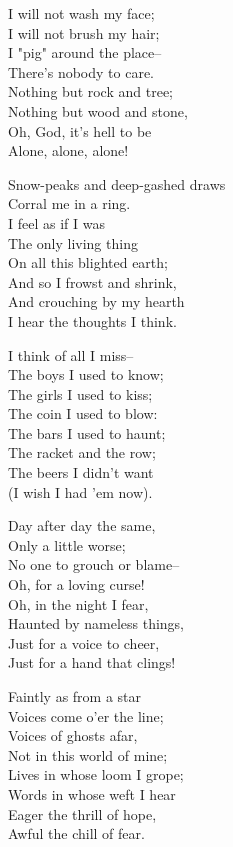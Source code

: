
\begin{poemblock}
I will not wash my face;\\
\idt I will not brush my hair;\\
I "pig" around the place--\\
\idt There's nobody to care.\\
Nothing but rock and tree;\\
\idt Nothing but wood and stone,\\
Oh, God, it's hell to be\\
\idt Alone, alone, alone!

Snow-peaks and deep-gashed draws\\
\idt Corral me in a ring.\\
I feel as if I was\\
\idt The only living thing\\
On all this blighted earth;\\
\idt And so I frowst and shrink,\\
And crouching by my hearth\\
\idt I hear the thoughts I think.

I think of all I miss--\\
\idt The boys I used to know;\\
The girls I used to kiss;\\
\idt The coin I used to blow:\\
The bars I used to haunt;\\
\idt The racket and the row;\\
The beers I didn't want\\
\idt (I wish I had 'em now).

Day after day the same,\\
\idt Only a little worse;\\
No one to grouch or blame--\\
\idt Oh, for a loving curse!\\
Oh, in the night I fear,\\
\idt Haunted by nameless things,\\
Just for a voice to cheer,\\
\idt Just for a hand that clings!

Faintly as from a star\\
\idt Voices come o'er the line;\\
Voices of ghosts afar,\\
\idt Not in this world of mine;\\
Lives in whose loom I grope;\\
\idt Words in whose weft I hear\\
Eager the thrill of hope,\\
\idt Awful the chill of fear.


\end{poemblock}

